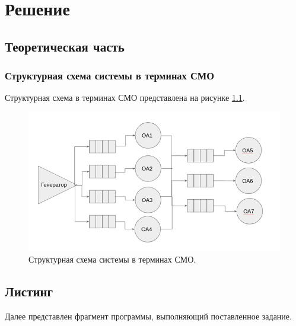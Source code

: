 \documentclass[14pt]{extreport}
\begin{document}
\chapter{Решение}
\section{Теоретическая часть}

\subsection{Структурная схема системы в терминах СМО}

Структурная схема в терминах СМО представлена на рисунке \ref{img:model}.

\begin{figure}[H]
	\begin{center}
		\includegraphics[scale=0.9]{imgs/model.png}
	\end{center}
	\caption{Структурная схема системы в терминах СМО.}
	\label{img:model}
\end{figure}

\section{Листинг}

Далее представлен фрагмент программы, выполняющий поставленное задание.
\end{document}
